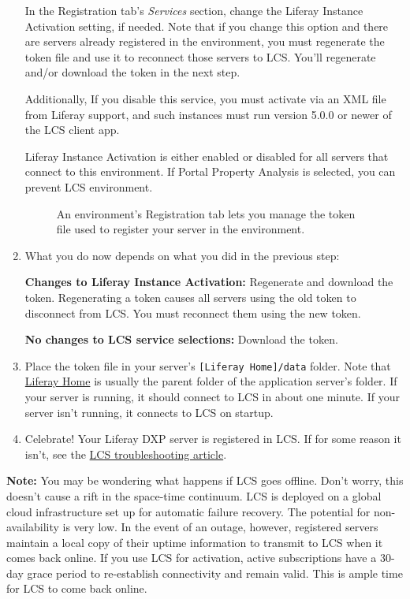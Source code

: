 \begin{enumerate}
  In the Registration tab's \emph{Services} section, change the Liferay
  Instance Activation setting, if needed. Note that if you change this
  option and there are servers already registered in the environment,
  you must regenerate the token file and use it to reconnect those
  servers to LCS. You'll regenerate and/or download the token in the
  next step.

  Additionally, If you disable this service, you must activate via an
  XML file from Liferay support, and such instances must run version
  5.0.0 or newer of the LCS client app.

  Liferay Instance Activation is either enabled or disabled for all
  servers that connect to this environment. If Portal Property Analysis
  is selected, you can prevent LCS environment.

  \begin{figure}
  \centering
  \caption{An environment's Registration tab lets you manage the token
  file used to register your server in the environment.}
  \end{figure}
\item
  What you do now depends on what you did in the previous step:

  \textbf{Changes to Liferay Instance Activation:} Regenerate and
  download the token. Regenerating a token causes all servers using the
  old token to disconnect from LCS. You must reconnect them using the
  new token.

  \textbf{No changes to LCS service selections:} Download the token.
\item
  Place the token file in your server's
  \texttt{{[}Liferay\ Home{]}/data} folder. Note that
  \href{/docs/7-2/deploy/-/knowledge_base/d/liferay-home}{Liferay Home}
  is usually the parent folder of the application server's folder. If
  your server is running, it should connect to LCS in about one minute.
  If your server isn't running, it connects to LCS on startup.
\item
  Celebrate! Your Liferay DXP server is registered in LCS. If for some
  reason it isn't, see the
  \href{/docs/7-2/deploy/-/knowledge_base/d/troubleshooting-your-lcs-connection}{LCS
  troubleshooting article}.
\end{enumerate}

\noindent\hrulefill

\textbf{Note:} You may be wondering what happens if LCS goes offline.
Don't worry, this doesn't cause a rift in the space-time continuum. LCS
is deployed on a global cloud infrastructure set up for automatic
failure recovery. The potential for non-availability is very low. In the
event of an outage, however, registered servers maintain a local copy of
their uptime information to transmit to LCS when it comes back online.
If you use LCS for activation, active subscriptions have a 30-day grace
period to re-establish connectivity and remain valid. This is ample time
for LCS to come back online.

